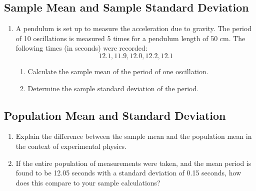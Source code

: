 \documentclass[12pt]{article}
\begin{document}
	\subsection*{Sample Mean and Sample Standard Deviation}
	\begin{enumerate}
		\item A pendulum is set up to measure the acceleration due to gravity. The period of 10 oscillations is measured 5 times for a pendulum length of 50 cm. The following times (in seconds) were recorded:
		\[ 12.1, 11.9, 12.0, 12.2, 12.1 \]
		\begin{enumerate}
			\item Calculate the sample mean of the period of one oscillation.
			\item Determine the sample standard deviation of the period.
		\end{enumerate}
	\end{enumerate}
	
	\subsection*{Population Mean and Standard Deviation}
	\begin{enumerate}
		\item Explain the difference between the sample mean and the population mean in the context of experimental physics.
		\item If the entire population of measurements were taken, and the mean period is found to be 12.05 seconds with a standard deviation of 0.15 seconds, how does this compare to your sample calculations?
	\end{enumerate}
	
\end{document}
